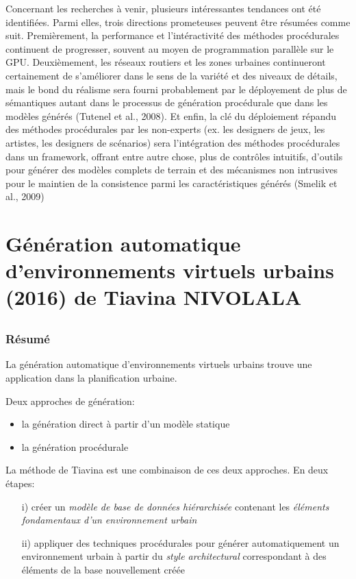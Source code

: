 \documentclass[11pt]{report}
\begin{document}
Concernant les recherches à venir, plusieurs intéressantes tendances ont été identifiées. Parmi elles, trois directions prometeuses peuvent être résumées comme suit. Premièrement, la performance et l'intéractivité des méthodes procédurales continuent de progresser, souvent au moyen de programmation parallèle sur le GPU. Deuxièmement, les réseaux routiers et les zones urbaines continueront certainement de s'améliorer dans le sens de la variété et des niveaux de détails, mais le bond du réalisme sera fourni probablement par le déployement de plus de sémantiques autant dans le processus de génération procédurale que dans les modèles générés (Tutenel et al., 2008). Et enfin, la clé du déploiement répandu des méthodes procédurales par les non-experts (ex. les designers de jeux, les artistes, les designers de scénarios) sera l'intégration des méthodes procédurales dans un framework, offrant entre autre chose, plus de contrôles intuitifs, d'outils pour générer des modèles complets de terrain et des mécanismes non intrusives pour le maintien de la consistence parmi les caractéristiques générés  (Smelik et al., 2009)

\part{Génération automatique d’environnements virtuels urbains (2016) de Tiavina NIVOLALA}

\chapter*{}

\section*{Résumé}

La génération automatique d’environnements virtuels urbains trouve une application dans la planification urbaine.

Deux approches de génération:
\begin{itemize}
\item la génération direct à partir d’un modèle statique
\item la génération procédurale
\end{itemize}


La méthode de Tiavina est une combinaison de ces deux approches.
En deux étapes:
\begin{itemize}
\item[i)] créer un \textit{modèle de base de données hiérarchisée} contenant les \textit{éléments fondamentaux d’un environnement urbain}
\item[ii)] appliquer des techniques procédurales pour générer automatiquement un environnement urbain à partir du \textit{style architectural} correspondant à des éléments de la base nouvellement créée
\end{itemize}
\end{document}
